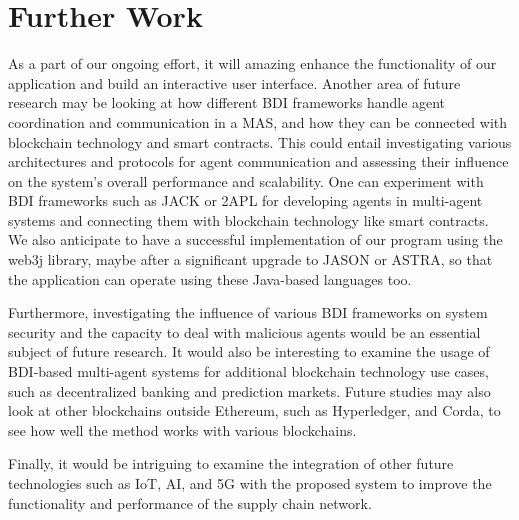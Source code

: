 {\chapter{Further Work}}
As a part of our ongoing effort, it will amazing enhance the functionality of our application and build an interactive user interface. Another area of future research may be looking at how different \ac{BDI} frameworks handle agent coordination and communication in a \ac{MAS}, and how they can be connected with blockchain technology and smart contracts. This could entail investigating various architectures and protocols for agent communication and assessing their influence on the system's overall performance and scalability. One can experiment with \ac{BDI} frameworks such as JACK or 2APL for developing agents in multi-agent systems and connecting them with blockchain technology like smart contracts. We also anticipate to have a successful implementation of our program using the web3j library, maybe after a significant upgrade to JASON or ASTRA, so that the application can operate using these Java-based languages too.

\vspace{.5cm}

Furthermore, investigating the influence of various \ac{BDI} frameworks on system security and the capacity to deal with malicious agents would be an essential subject of future research. It would also be interesting to examine the usage of \ac{BDI}-based multi-agent systems for additional blockchain technology use cases, such as decentralized banking and prediction markets. Future studies may also look at other blockchains outside Ethereum, such as Hyperledger, and Corda, to see how well the method works with various blockchains.

\vspace{.5cm}

Finally, it would be intriguing to examine the integration of other future technologies such as \ac{IoT}, \ac{AI}, and 5G with the proposed system to improve the functionality and performance of the supply chain network.